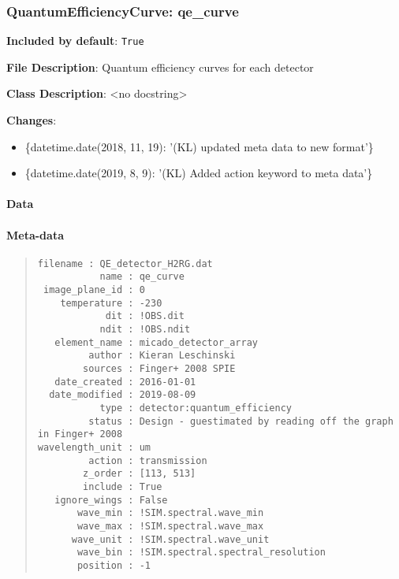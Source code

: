 \subsubsection{QuantumEfficiencyCurve: \textquotedbl{}qe\_curve\textquotedbl{}%
  \label{quantumefficiencycurve-qe-curve}%
}

\textbf{Included by default}: \texttt{True}

\textbf{File Description}: Quantum efficiency curves for each detector

\textbf{Class Description}: <no docstring>

\textbf{Changes}:

\begin{itemize}
\item \{datetime.date(2018, 11, 19): '(KL) updated meta data to new format'\}

\item \{datetime.date(2019, 8, 9): '(KL) Added action keyword to meta data'\}
\end{itemize}


\paragraph{Data%
  \label{id3}%
}


\paragraph{Meta-data%
  \label{id4}%
}

\begin{quote}
\begin{alltt}
\begin{lstlisting}[frame=single]
       filename : QE_detector_H2RG.dat
           name : qe_curve
 image_plane_id : 0
    temperature : -230
            dit : !OBS.dit
           ndit : !OBS.ndit
   element_name : micado_detector_array
         author : Kieran Leschinski
        sources : Finger+ 2008 SPIE
   date_created : 2016-01-01
  date_modified : 2019-08-09
           type : detector:quantum_efficiency
         status : Design - guestimated by reading off the graph in Finger+ 2008
wavelength_unit : um
         action : transmission
        z_order : [113, 513]
        include : True
   ignore_wings : False
       wave_min : !SIM.spectral.wave_min
       wave_max : !SIM.spectral.wave_max
      wave_unit : !SIM.spectral.wave_unit
       wave_bin : !SIM.spectral.spectral_resolution
       position : -1
\end{lstlisting}
\end{alltt}
\end{quote}


